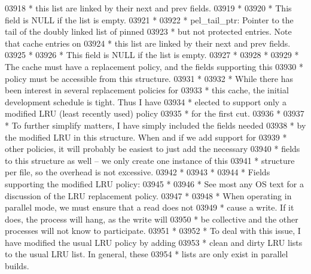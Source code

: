 \begin{DoxyCode}
03918 \textcolor{comment}{ *      this list are linked by their next and prev fields.}
03919 \textcolor{comment}{ *}
03920 \textcolor{comment}{ *              This field is NULL if the list is empty.}
03921 \textcolor{comment}{ *}
03922 \textcolor{comment}{ * pel\_tail\_ptr: Pointer to the tail of the doubly linked list of pinned}
03923 \textcolor{comment}{ *      but not protected entries.  Note that cache entries on}
03924 \textcolor{comment}{ *      this list are linked by their next and prev fields.}
03925 \textcolor{comment}{ *}
03926 \textcolor{comment}{ *              This field is NULL if the list is empty.}
03927 \textcolor{comment}{ *}
03928 \textcolor{comment}{ *}
03929 \textcolor{comment}{ * The cache must have a replacement policy, and the fields supporting this}
03930 \textcolor{comment}{ * policy must be accessible from this structure.}
03931 \textcolor{comment}{ *}
03932 \textcolor{comment}{ * While there has been interest in several replacement policies for}
03933 \textcolor{comment}{ * this cache, the initial development schedule is tight.  Thus I have}
03934 \textcolor{comment}{ * elected to support only a modified LRU (least recently used) policy }
03935 \textcolor{comment}{ * for the first cut.}
03936 \textcolor{comment}{ *}
03937 \textcolor{comment}{ * To further simplify matters, I have simply included the fields needed}
03938 \textcolor{comment}{ * by the modified LRU in this structure.  When and if we add support for}
03939 \textcolor{comment}{ * other policies, it will probably be easiest to just add the necessary}
03940 \textcolor{comment}{ * fields to this structure as well -- we only create one instance of this}
03941 \textcolor{comment}{ * structure per file, so the overhead is not excessive.}
03942 \textcolor{comment}{ *}
03943 \textcolor{comment}{ *}
03944 \textcolor{comment}{ * Fields supporting the modified LRU policy:}
03945 \textcolor{comment}{ *}
03946 \textcolor{comment}{ * See most any OS text for a discussion of the LRU replacement policy.}
03947 \textcolor{comment}{ *}
03948 \textcolor{comment}{ * When operating in parallel mode, we must ensure that a read does not}
03949 \textcolor{comment}{ * cause a write.  If it does, the process will hang, as the write will}
03950 \textcolor{comment}{ * be collective and the other processes will not know to participate.}
03951 \textcolor{comment}{ *}
03952 \textcolor{comment}{ * To deal with this issue, I have modified the usual LRU policy by adding}
03953 \textcolor{comment}{ * clean and dirty LRU lists to the usual LRU list.  In general, these }
03954 \textcolor{comment}{ * lists are only exist in parallel builds.}

\end{DoxyCode}
